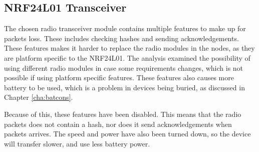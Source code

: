 \subsection{NRF24L01 Transceiver}
The chosen radio transceiver module contains multiple features to make up for packets loss. These includes checking hashes and sending acknowledgements\cite{nf24datasheet}.
These features makes it harder to replace the radio modules in the nodes, as they are platform specific to the NRF24L01. The analysis examined the possibility of using different radio modules in case some requirements changes, which is not possible if using platform specific features. These features also causes more battery to be used, which is a problem in devices being buried, as discussed in Chapter \ref{cha:batcons}.

Because of this, these features have been disabled. This means that the radio packets does not contain a hash, nor does it send acknowledgements when packets arrives. The speed and power have also been turned down, so the device will transfer slower, and use less battery power.
